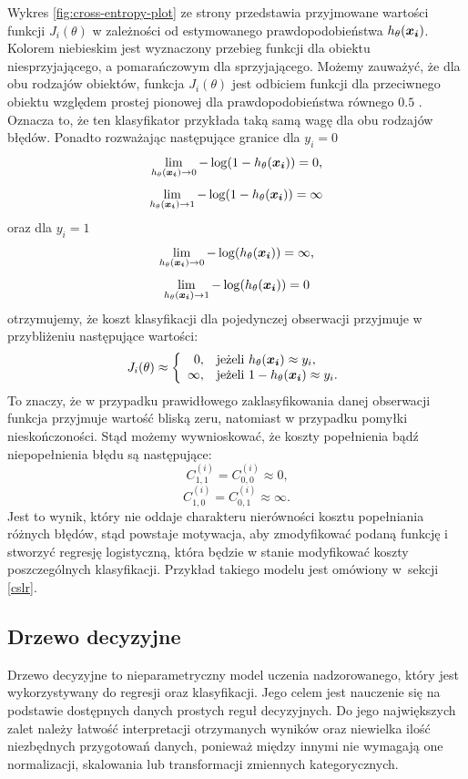\documentclass[inzynierska]{pwr_wmat_praca_dyplomowa}
\theoremstyle{plain}
\numberwithin{theorem}{chapter}
\theoremstyle{definition}
\numberwithin{theorem}{chapter}
\begin{document}
Wykres \ref{fig:cross-entropy-plot} ze strony \pageref{fig:cross-entropy-plot} przedstawia przyjmowane wartości funkcji $J_i(\theta)$ w zależności od estymowanego prawdopodobieństwa $h_{\theta}(\boldsymbol{x_i})$. Kolorem niebieskim jest wyznaczony przebieg funkcji dla obiektu niesprzyjającego, a pomarańczowym dla sprzyjającego. Możemy zauważyć, że dla obu rodzajów obiektów, funkcja $J_i(\theta)$ jest odbiciem funkcji dla przeciwnego obiektu względem prostej pionowej dla prawdopodobieństwa równego $0.5$ . Oznacza to, że ten klasyfikator przykłada taką samą wagę dla obu rodzajów błędów. Ponadto rozważając następujące granice dla $y_i=0$
$$ \lim\limits_{h_{\theta}(\boldsymbol{x_i})\to 0} -\log(1-h_{\theta}(\boldsymbol{x_i})) = 0 \text{,}$$
$$ \lim\limits_{h_{\theta}(\boldsymbol{x_i})\to 1} -\log(1-h_{\theta}(\boldsymbol{x_i})) = \infty $$
oraz dla $y_i=1$
$$ \lim\limits_{h_{\theta}(\boldsymbol{x_i})\to 0} -\log(h_{\theta}(\boldsymbol{x_i})) = \infty \text{,}$$
$$ \lim\limits_{h_{\theta}(\boldsymbol{x_i})\to 1} -\log(h_{\theta}(\boldsymbol{x_i})) = 0 $$
otrzymujemy, że koszt klasyfikacji dla pojedynczej obserwacji przyjmuje w przybliżeniu następujące wartości:
$$
J_i(\theta) \approx \left\{
\begin{array}{rl}
0, &\mbox{jeżeli $h_{\theta}(\boldsymbol{x_i}) \approx y_i$}, \\
\infty, &\mbox{jeżeli $1 - h_{\theta}(\boldsymbol{x_i}) \approx y_i$}.
\end{array}{}
\right.
$$
To znaczy, że w przypadku prawidłowego zaklasyfikowania danej obserwacji funkcja przyjmuje wartość bliską zeru, natomiast w przypadku pomyłki nieskończoności. Stąd możemy wywnioskować, że koszty popełnienia bądź niepopełnienia błędu są następujące:
$$ C^{(i)}_{1,1} = C^{(i)}_{0,0} \approx 0 \text{,}$$
$$ C^{(i)}_{1,0} = C^{(i)}_{0,1} \approx \infty \text{.}$$
Jest to wynik, który nie oddaje charakteru nierówności kosztu popełniania różnych błędów, stąd powstaje motywacja, aby zmodyfikować podaną funkcję i stworzyć regresję logistyczną, która będzie w stanie modyfikować koszty poszczególnych klasyfikacji. Przykład takiego modelu jest omówiony w~sekcji \ref{cslr}.

\subsection{Drzewo decyzyjne}
\label{drzewo}
Drzewo decyzyjne to nieparametryczny model uczenia nadzorowanego, który jest wykorzystywany do regresji oraz klasyfikacji. Jego celem jest nauczenie się na podstawie dostępnych danych prostych reguł decyzyjnych. Do jego największych zalet należy łatwość interpretacji otrzymanych wyników oraz niewielka ilość niezbędnych przygotowań danych, ponieważ między innymi nie wymagają one normalizacji, skalowania lub transformacji zmiennych kategorycznych.
\end{document}
